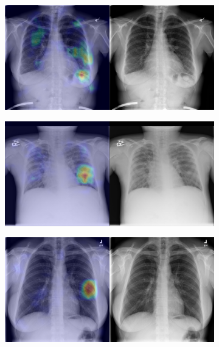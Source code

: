 \begin{figure}[b]
\begin{subfigure}{0.4\textwidth}
    \end{subfigure}
    \begin{subfigure}{0.4\textwidth}
        \centering
        \includegraphics[width=1.0\textwidth]{Chapters/5. Conclusiones/img/Nodule/1_1_00001320_002.png}
    \end{subfigure}
    \begin{subfigure}{0.4\textwidth}
        \centering
        \includegraphics[width=1.0\textwidth]{Chapters/5. Conclusiones/img/Nodule/1_1_00001332_000.png}
    \end{subfigure}
    \begin{subfigure}{0.4\textwidth}
        \centering
        \includegraphics[width=1.0\textwidth]{Chapters/5. Conclusiones/img/Nodule/1_1_00001456_000.png}

\end{subfigure}
\end{figure}
